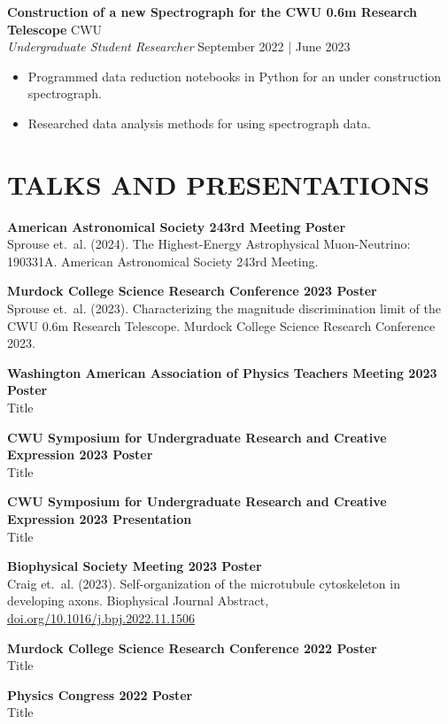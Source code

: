 \documentclass[a4paper,9pt]{extarticle}
\begin{document}
\noindent\textbf{Construction of a new Spectrograph for the CWU 0.6m Research Telescope} \hfill CWU\\
\textit{Undergraduate Student Researcher} \hfill September 2022 | June 2023
\begin{itemize}
    \item Programmed data reduction notebooks in Python for an under construction spectrograph.
    \item Researched data analysis methods for using spectrograph data.
\end{itemize}


\section*{TALKS AND PRESENTATIONS}
\noindent\textbf{American Astronomical Society 243rd Meeting Poster}\\
Sprouse et.\ al. (2024). The Highest-Energy Astrophysical Muon-Neutrino: 190331A. American Astronomical Society 243rd Meeting.

\noindent\textbf{Murdock College Science Research Conference 2023 Poster}\\
Sprouse et.\ al. (2023). Characterizing the magnitude discrimination limit of the CWU 0.6m Research Telescope. Murdock College Science Research Conference 2023.

\noindent\textbf{Washington American Association of Physics Teachers Meeting 2023 Poster}\\
Title

\noindent\textbf{CWU Symposium for Undergraduate Research and Creative Expression 2023 Poster}\\
Title

\noindent\textbf{CWU Symposium for Undergraduate Research and Creative Expression 2023 Presentation}\\
Title

\noindent\textbf{Biophysical Society Meeting 2023 Poster}\\
Craig et.\ al. (2023). Self-organization of the microtubule cytoskeleton in developing axons. Biophysical Journal Abstract, \href{www.doi.org/10.1016/j.bpj.2022.11.1506}{doi.org/10.1016/j.bpj.2022.11.1506}

\noindent\textbf{Murdock College Science Research Conference 2022 Poster}\\
Title

\noindent\textbf{Physics Congress 2022 Poster}\\
Title
\end{document}
